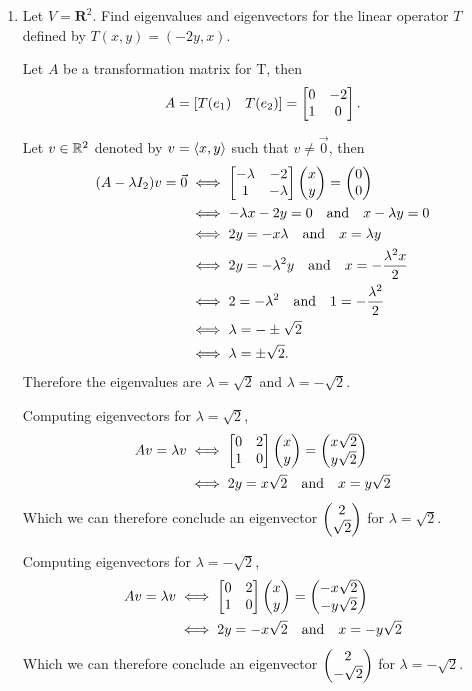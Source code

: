 \begin{enumerate}
\newpage
    \item Let $V = \mathbf{R}^2$. Find eigenvalues and eigenvectors for the linear operator $T$ defined by $T(x,y) = (-2y , x)$.
    \begin{mybox}
        Let $A$ be a transformation matrix for T, then
        $$A = \left[ {T(e_1) \quad T(e_2)} \right] = \begin{bmatrix}{0} & {-2}\\{1}&{0}\end{bmatrix}.$$

        \nl Let $v \in \mathbb{R}^2$ denoted by $v = \left\langle{x,y}\right\rangle$ such that $v \neq \vec{0}$, then
        \begin{align*}
                (A-\lambda I_2)v = \vec{0} &\iff \begin{bmatrix}{-\lambda} & {-2}\\{1}&{-\lambda}\end{bmatrix} \begin{pmatrix}{x}\\{y}\end{pmatrix} = \begin{pmatrix}{0}\\{0}\end{pmatrix}\\
                &\iff -\lambda x - 2y = 0 \quad \text{and} \quad x - \lambda y = 0\\
                & \iff 2y = -x\lambda  \quad \text{and} \quad x = \lambda y\\
                & \iff 2y = -\lambda^2 y  \quad \text{and} \quad x = -\frac{\lambda^2x}{2}\\
                & \iff 2 = -\lambda^2  \quad \text{and} \quad 1 = -\frac{\lambda^2}{2}\\
                & \iff \lambda = -\pm \sqrt{2}\\
                & \iff \lambda = \pm \sqrt{2}.
        \end{align*}
        Therefore the eigenvalues are $\lambda = \sqrt{2}$ and $\lambda = -\sqrt{2}$. 

        \nnl Computing eigenvectors for $\lambda = \sqrt{2}$, 
        \begin{align*}
            Av = \lambda v & \iff \begin{bmatrix}{0} & {2}\\{1}&{0}\end{bmatrix} \begin{pmatrix}{x}\\{y}\end{pmatrix} = \begin{pmatrix}{x\sqrt{2}}\\{y\sqrt{2}}\end{pmatrix}\\
            &\iff 2y = x\sqrt{2} \quad \text{and} \quad x = y\sqrt{2}
        \end{align*}
        Which we can therefore conclude an eigenvector $\begin{pmatrix}{2}\\{\sqrt{2}}\end{pmatrix}$ for $\lambda = \sqrt{2}$.

        \nl Computing eigenvectors for $\lambda = -\sqrt{2}$, 
        \begin{align*}
            Av = \lambda v & \iff \begin{bmatrix}{0} & {2}\\{1}&{0}\end{bmatrix} \begin{pmatrix}{x}\\{y}\end{pmatrix} = \begin{pmatrix}{-x\sqrt{2}}\\{-y\sqrt{2}}\end{pmatrix}\\
            &\iff 2y = -x\sqrt{2} \quad \text{and} \quad x = -y\sqrt{2}
        \end{align*}
        Which we can therefore conclude an eigenvector $\begin{pmatrix}{2}\\{-\sqrt{2}}\end{pmatrix}$ for $\lambda = -\sqrt{2}$.
    \end{mybox}

    \end{enumerate}